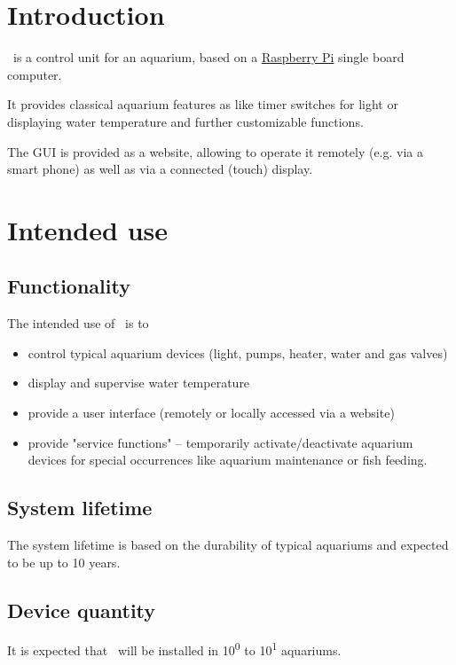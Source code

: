 \documentclass{../../git_submodules/common_docu/doc_class}
\author{\defaultAuthor}
\date{2019-04-04}
\begin{document}
  
  \section{Introduction}
  \ThisProjectName~is a control unit for an aquarium, based on a \hyperref{https://de.wikipedia.org/wiki/Raspberry_Pi}{}{}{Raspberry Pi} single board computer.
  
  It provides classical aquarium features as like timer switches for light or displaying water temperature and further customizable functions.
  
  The GUI is provided as a website, allowing to operate it remotely (e.g. via a smart phone) as well as via a connected (touch) display.
  
  \section{Intended use}
  \subsection{Functionality}
  The intended use of \ThisProjectName~is to 
  \begin{itemize}
    \item control typical aquarium  devices (light, pumps, heater, water and gas valves)
    \item display and supervise water temperature
    \item provide a user interface (remotely or locally accessed via a website)
    \item provide "service functions" -- temporarily activate/deactivate aquarium devices for special occurrences like aquarium maintenance or fish feeding.
  \end{itemize}

  \subsection{System lifetime}
  The system lifetime is based on the durability of typical aquariums and expected to be up to 10 years.
  
  \subsection{Device quantity}
  It is expected that \ThisProjectName~will be installed in 10\textsuperscript{0} to 10\textsuperscript{1} aquariums.
  
  
  
\end{document}
